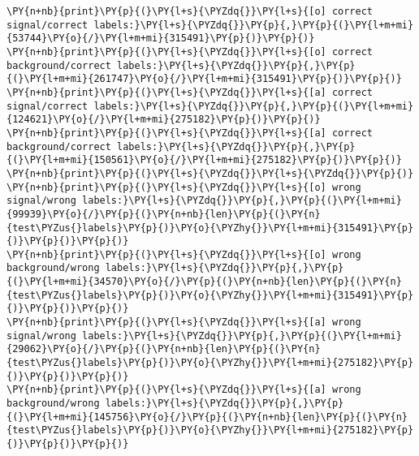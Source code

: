 {\par%
\vspace{-1\baselineskip}%
}%
\begin{notebookcell}[]%
\begin{addmargin}[\cellleftmargin]{0em}%
{\smaller%
\par%
%
\vspace{-1\smallerfontscale}%
\begin{Verbatim}[commandchars=\\\{\}]
\PY{n+nb}{print}\PY{p}{(}\PY{l+s}{\PYZdq{}}\PY{l+s}{[o] correct signal/correct labels:}\PY{l+s}{\PYZdq{}}\PY{p}{,}\PY{p}{(}\PY{l+m+mi}{53744}\PY{o}{/}\PY{l+m+mi}{315491}\PY{p}{)}\PY{p}{)}
\PY{n+nb}{print}\PY{p}{(}\PY{l+s}{\PYZdq{}}\PY{l+s}{[o] correct background/correct labels:}\PY{l+s}{\PYZdq{}}\PY{p}{,}\PY{p}{(}\PY{l+m+mi}{261747}\PY{o}{/}\PY{l+m+mi}{315491}\PY{p}{)}\PY{p}{)}
\PY{n+nb}{print}\PY{p}{(}\PY{l+s}{\PYZdq{}}\PY{l+s}{[a] correct signal/correct labels:}\PY{l+s}{\PYZdq{}}\PY{p}{,}\PY{p}{(}\PY{l+m+mi}{124621}\PY{o}{/}\PY{l+m+mi}{275182}\PY{p}{)}\PY{p}{)}
\PY{n+nb}{print}\PY{p}{(}\PY{l+s}{\PYZdq{}}\PY{l+s}{[a] correct background/correct labels:}\PY{l+s}{\PYZdq{}}\PY{p}{,}\PY{p}{(}\PY{l+m+mi}{150561}\PY{o}{/}\PY{l+m+mi}{275182}\PY{p}{)}\PY{p}{)}
\PY{n+nb}{print}\PY{p}{(}\PY{l+s}{\PYZdq{}}\PY{l+s}{\PYZdq{}}\PY{p}{)}
\PY{n+nb}{print}\PY{p}{(}\PY{l+s}{\PYZdq{}}\PY{l+s}{[o] wrong signal/wrong labels:}\PY{l+s}{\PYZdq{}}\PY{p}{,}\PY{p}{(}\PY{l+m+mi}{99939}\PY{o}{/}\PY{p}{(}\PY{n+nb}{len}\PY{p}{(}\PY{n}{test\PYZus{}labels}\PY{p}{)}\PY{o}{\PYZhy{}}\PY{l+m+mi}{315491}\PY{p}{)}\PY{p}{)}\PY{p}{)}
\PY{n+nb}{print}\PY{p}{(}\PY{l+s}{\PYZdq{}}\PY{l+s}{[o] wrong background/wrong labels:}\PY{l+s}{\PYZdq{}}\PY{p}{,}\PY{p}{(}\PY{l+m+mi}{34570}\PY{o}{/}\PY{p}{(}\PY{n+nb}{len}\PY{p}{(}\PY{n}{test\PYZus{}labels}\PY{p}{)}\PY{o}{\PYZhy{}}\PY{l+m+mi}{315491}\PY{p}{)}\PY{p}{)}\PY{p}{)}
\PY{n+nb}{print}\PY{p}{(}\PY{l+s}{\PYZdq{}}\PY{l+s}{[a] wrong signal/wrong labels:}\PY{l+s}{\PYZdq{}}\PY{p}{,}\PY{p}{(}\PY{l+m+mi}{29062}\PY{o}{/}\PY{p}{(}\PY{n+nb}{len}\PY{p}{(}\PY{n}{test\PYZus{}labels}\PY{p}{)}\PY{o}{\PYZhy{}}\PY{l+m+mi}{275182}\PY{p}{)}\PY{p}{)}\PY{p}{)}
\PY{n+nb}{print}\PY{p}{(}\PY{l+s}{\PYZdq{}}\PY{l+s}{[a] wrong background/wrong labels:}\PY{l+s}{\PYZdq{}}\PY{p}{,}\PY{p}{(}\PY{l+m+mi}{145756}\PY{o}{/}\PY{p}{(}\PY{n+nb}{len}\PY{p}{(}\PY{n}{test\PYZus{}labels}\PY{p}{)}\PY{o}{\PYZhy{}}\PY{l+m+mi}{275182}\PY{p}{)}\PY{p}{)}\PY{p}{)}
\end{Verbatim}
%
\par%
\vspace{-1\smallerfontscale}}%
\end{addmargin}
\end{notebookcell}

